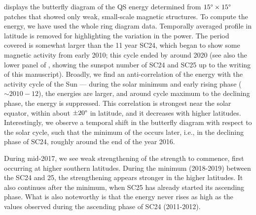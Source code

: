\documentclass{aa}
\begin{document}


 displays the butterfly diagram of the QS
\fff energy determined
from $15\degree \times 15\degree$ patches that showed only weak, small-scale magnetic structures.
To compute the \fff
energy, we have used the whole ring diagram data.
Temporally averaged profile in latitude is removed for highlighting the variation in the
\fff power. The period covered is somewhat larger than the 11 year 
SC24,
which
began to show some magnetic activity from early 2010; this cycle ended by around 2020 (see also the lower panel of , showing the sunspot number of SC24 and SC25 up to the writing of this manuscript).
Broadly, we find an anti-correlation of the \fff 
energy with the activity cycle of the
Sun --- during the solar minimum and early rising phase ($\sim 2010-12$), the \fff
energies
are larger, and around cycle maximum to the declining phase,
the \fff
energy 
is suppressed.
This correlation is strongest near the solar equator, within about $\pm 20\degree$ in
latitude, and it decreases with higher latitudes.
Interestingly, we observe a temporal shift in the \fff butterfly diagram with respect to the
solar cycle, such that the minimum of the \fff occurs later, i.e., in the declining phase of
SC24, roughly around the end of the year 2016.

During mid-2017, we see weak strengthening of the \fff strength to commence, first occurring at higher southern latitudes. During the minimum (2018-2019) between the SC24 and 25, the strengthening appears stronger in the higher latitudes. It also continues after the minimum, when 
SC25
has already started its ascending phase. What is also noteworthy is that the \fff
energy
never rises as high as the values observed during the ascending phase of SC24 (2011-2012).
\end{document}
